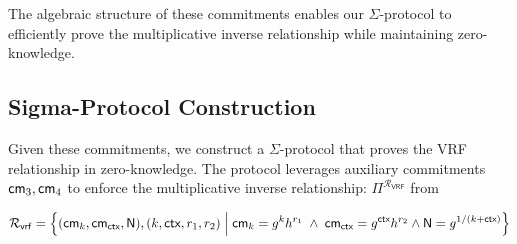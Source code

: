    

The algebraic structure of these commitments enables our $\Sigma$-protocol to efficiently prove the multiplicative inverse relationship while maintaining zero-knowledge.


\subsection{Sigma-Protocol Construction}
Given these commitments, we construct a $\Sigma$-protocol that proves the VRF relationship in zero-knowledge. The protocol leverages auxiliary commitments $\mathsf{cm}_3, \mathsf{cm}_4$
to enforce the multiplicative inverse relationship: $\Pi^{\mathcal{R}_{\textsf{VRF}}}$ from 

    \[
        \mathcal{R}_{\mathsf{vrf}} = \left\{ (\mathsf{cm}_k, \mathsf{cm}_{\textsf{ctx}}, \mathsf{N}), (k, \textsf{ctx}, r_1, r_2) \; \Big| \;  \mathsf{cm}_k = g^k h^{r_1} \; \land \;
                \mathsf{cm}_{\textsf{ctx}} = g^{\textsf{ctx}} h^{r_2} \land \textsf{N} = g^{1/(k + \textsf{ctx})} \right\}
    \]



